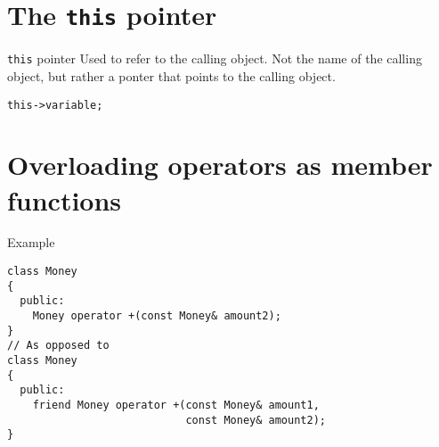 \documentclass[\main/notes.tex]{subfiles}
\begin{document}
		\section{The \texttt{this} pointer}
			\begin{definition}{\texttt{this} pointer}
				Used to refer to the calling object. Not the name of the calling object, but rather a ponter that points to the calling object.
				\begin{verbatim}
this->variable;
				\end{verbatim}
			\end{definition}

		\section{Overloading operators as member functions}
			\begin{codebox}{Example}
				\begin{verbatim}
class Money
{
  public:
    Money operator +(const Money& amount2);
}
// As opposed to
class Money
{
  public:
    friend Money operator +(const Money& amount1,
                            const Money& amount2);
}
				\end{verbatim}
			\end{codebox}
\end{document}
